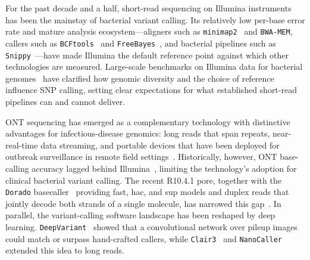 \documentclass[11pt]{article}
\begin{document}
For the past decade and a half, short-read sequencing on Illumina instruments has been the mainstay of bacterial variant calling. Its relatively low per-base error rate and mature analysis ecosystem---aligners such as \texttt{minimap2}~\citep{li2018minimap2} and \texttt{BWA-MEM}, callers such as \texttt{BCFtools}~\citep{danecek2021bcftools} and \texttt{FreeBayes}~\citep{garrison2012freebayes}, and bacterial pipelines such as \texttt{Snippy}~\citep{seemann_snippy}---have made Illumina the default reference point against which other technologies are measured. Large-scale benchmarks on Illumina data for bacterial genomes~\citep{bush2020genomic} have clarified how genomic diversity and the choice of reference influence SNP calling, setting clear expectations for what established short-read pipelines can and cannot deliver.

ONT sequencing has emerged as a complementary technology with distinctive advantages for infectious-disease genomics: long reads that span repeats, near-real-time data streaming, and portable devices that have been deployed for outbreak surveillance in remote field settings~\citep{quick2016realtime,amarasinghe2020opportunities}. Historically, however, ONT base-calling accuracy lagged behind Illumina~\citep{shafin2020nanopore}, limiting the technology's adoption for clinical bacterial variant calling. The recent R10.4.1 pore, together with the \texttt{Dorado} basecaller~\citep{oxfordnanopore_dorado} providing fast, hac, and sup models and duplex reads that jointly decode both strands of a single molecule, has narrowed this gap~\citep{sereika2022oxford,wick2023perfect}. In parallel, the variant-calling software landscape has been reshaped by deep learning. \texttt{DeepVariant}~\citep{poplin2018deepvariant} showed that a convolutional network over pileup images could match or surpass hand-crafted callers, while \texttt{Clair3}~\citep{zheng2022clair3} and \texttt{NanoCaller}~\citep{ahsan2021nanocaller} extended this idea to long reads.
\end{document}
